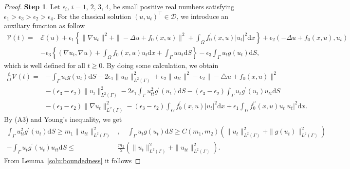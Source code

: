 \documentclass{elsarticle}
\begin{document}
\begin{proof}
\textbf{Step 1}. Let $\epsilon_{i}$, $i=1$, $2$, $3$, $4$, be small positive real numbers satisfying $\epsilon_1>\epsilon_3>\epsilon_2>\epsilon_4$. For the classical solution $(u, u_t)^\top\in\mathcal{D}$, we introduce an auxiliary function as follow
\begin{equation*}
\begin{split}
	\mathcal{V}(t) =& \mathcal{E}(u) + \epsilon_1\left\{\|\nabla u_t\|^{2} +\|-\Delta u+f_0(x, u)\|^{2}+\int_{\Omega}f_0^{\prime}(x, u)|u_t|^2 \mathrm{d}x\right\}+\epsilon_{2}(-\Delta u+f_0(x, u), u_t)\\
	&-\epsilon_{3}\left\{(\nabla u_t, \nabla u)+\int_{\Omega}f_0(x, u)u_{t}\mathrm{d}x+\int_{\Gamma}u u_{t}\mathrm{d}S\right\} -\epsilon_3\int_{\Gamma}u_t g(u_{t})\mathrm{d}S,
\end{split}
\end{equation*}
which is well defined for all $t\geqslant 0$. By doing some calculation, we obtain
\begin{equation}\label{thm5_2}
\begin{split}
	\frac{\mathrm{d}}{\mathrm{d}t}\mathcal{V}(t) =& -\int_{\Gamma}u_t g(u_{t})\mathrm{d}S - 2\epsilon_1\|u_{tt}\|^2_{L^2(\Gamma)}+  \epsilon_2\|u_{tt}\|^2- \epsilon_2\|-\triangle u + f_0(x, u)\|^2 \\
	&- (\epsilon_3-\epsilon_2) \|u_{t}\|^2_{L^2(\Gamma)}- 2\epsilon_1\int_{\Gamma}u_{tt}^2 g^{\prime}(u_{t})\mathrm{d}S-(\epsilon_3-\epsilon_2) \int_{\Gamma}u_{t}g^{\prime}(u_{t})u_{tt}\mathrm{d}S\\
	&-  (\epsilon_3-\epsilon_2) \|\nabla u_{t}\|^2_{L^2(\Gamma)} - (\epsilon_3-\epsilon_2)\int_{\Omega}f_0^{\prime}(x, u)|u_t|^2 \mathrm{d}x+\epsilon_1\int_{\Omega}f_0^{\prime\prime}(x, u)u_t|u_t|^2 \mathrm{d}x.
\end{split}
\end{equation}
By (A3) and Young's inequality, we get
\begin{equation}\label{thm5_3}
\begin{split}
\int_{\Gamma}u_{tt}^2 g^{\prime}(u_{t})\mathrm{d}S\geqslant m_1\|u_{tt}\|^2_{L^2(\Gamma)}&, \quad \int_{\Gamma}u_t g(u_{t})\mathrm{d}S\geqslant C(m_1, m_2) \left(\|u_{t}\|^2_{L^2(\Gamma)}+\|g(u_{t})\|^2_{L^2(\Gamma)}\right)\\
 -\int_{\Gamma}u_{t}g^{\prime}(u_{t})u_{tt}\mathrm{d}S \leqslant &\frac{m_2}{2}(\|u_{t}\|^2_{L^2(\Gamma)} + \|u_{tt}\|^2_{L^2(\Gamma)}).
\end{split}
\end{equation}
From Lemma~\ref{solu:boundedness} it follows

\end{proof}
\end{document}
